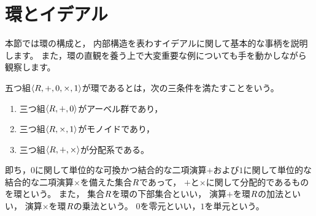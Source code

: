 \NewDocumentCommand{\THEN}{}{\(\Longrightarrow\)}

\section{環とイデアル}

本節では環の構成と，
内部構造を表わすイデアルに関して基本的な事柄を説明します。
また，環の直観を養う上で大変重要な例についても手を動かしながら観察します。

\begin{definition}
    五つ組\( \OrderedTuple<\Set<R>, +, 0, \times, 1> \)が環であるとは，次の三条件を満たすことをいう。
    \begin{enumerate}
        \item 三つ組\( \OrderedTuple<\Set<R>, +, 0> \)がアーベル群であり，
        \item 三つ組\( \OrderedTuple<\Set<R>, \times, 1> \)がモノイドであり，
        \item 三つ組\( \OrderedTuple<\Set<R>, +, \times> \)が分配系である。
    \end{enumerate}
    即ち，\(0\)に関して単位的な可換かつ結合的な二項演算\(+\)および\(1\)に関して単位的な結合的な二項演算\(\times\)を備えた集合\(\Set<R>\)であって，
    \(+\)と\(\times\)に関して分配的であるものを環という。
    また，
    集合\(\Set<R>\)を環の下部集合といい，
    演算\(+\)を環\(\Ring\)の加法といい，
    演算\(\times\)を環\(\Ring\)の乗法という。
    \(0\)を零元といい，\(1\)を単元という。
\end{definition}

